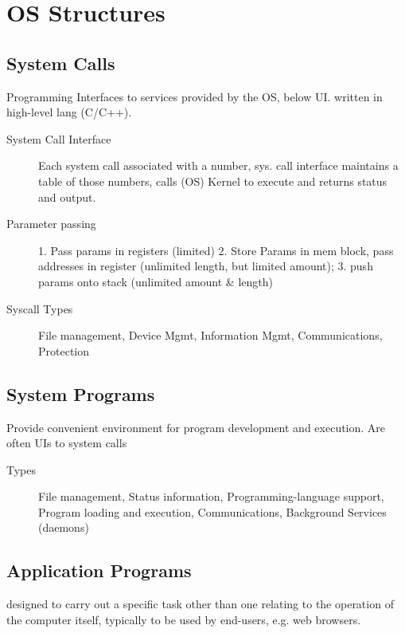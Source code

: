 \section*{OS Structures}

\subsection*{System Calls}
Programming Interfaces to services provided by the OS, below UI. written in high-level lang (C/C++). %
\begin{description}
    \item[System Call Interface] Each system call associated with a number, sys. call interface maintains a table of those numbers, calls (OS) Kernel to execute and returns status and output.
   \item[Parameter passing] 1. Pass params in registers (limited) 2. Store Params in mem block, pass addresses in register (unlimited length, but limited amount); 3. push params onto stack (unlimited amount \& length) %
  \item[Syscall Types] File management, Device Mgmt, Information Mgmt, Communications, Protection
\end{description}

\subsection*{System Programs}
Provide convenient environment for program development and execution. Are often UIs to system calls
\begin{description}
  \item[Types] File management, Status information, Programming-language support, Program loading and execution, Communications, Background Services (daemons)
\end{description}

\subsection*{Application Programs}
designed to carry out a specific task other than one relating to the operation of the computer itself, typically to be used by end-users, e.g. web browsers.

